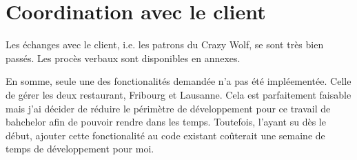
\chapter[Le client]{Coordination avec le client}
Les échanges avec le client, i.e. les patrons du Crazy Wolf, se sont très bien passés. Les procès verbaux sont disponibles en annexes. 

En somme, seule une des fonctionalités demandée n'a pas été impléementée. Celle de gérer les deux restaurant, Fribourg et Lausanne. Cela est parfaitement faisable mais j'ai décider de réduire le périmètre de développement pour ce travail de bahchelor afin de pouvoir rendre dans les temps. Toutefois, l'ayant su dès le début, ajouter cette fonctionalité au code existant coûterait une semaine de temps de développement pour moi.


    